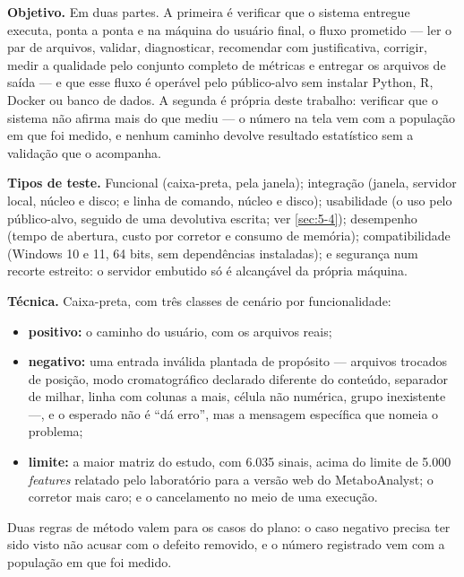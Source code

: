 \textbf{Objetivo.} Em duas partes. A primeira é verificar que o sistema entregue executa, ponta a ponta e na máquina do usuário final, o fluxo prometido --- ler o par de arquivos, validar, diagnosticar, recomendar com justificativa, corrigir, medir a qualidade pelo conjunto completo de métricas e entregar os arquivos de saída --- e que esse fluxo é operável pelo público-alvo sem instalar Python, R, Docker ou banco de dados. A segunda é própria deste trabalho: verificar que o sistema não afirma mais do que mediu --- o número na tela vem com a população em que foi medido, e nenhum caminho devolve resultado estatístico sem a validação que o acompanha.

\textbf{Tipos de teste.} Funcional (caixa-preta, pela janela); integração (janela, servidor local, núcleo e disco; e linha de comando, núcleo e disco); usabilidade (o uso pelo público-alvo, seguido de uma devolutiva escrita; ver \ref{sec:5-4}); desempenho (tempo de abertura, custo por corretor e consumo de memória); compatibilidade (Windows 10 e 11, 64 bits, sem dependências instaladas); e segurança num recorte estreito: o servidor embutido só é alcançável da própria máquina.

\textbf{Técnica.} Caixa-preta, com três classes de cenário por funcionalidade:

\begin{itemize}
\item \textbf{positivo:} o caminho do usuário, com os arquivos reais;
\item \textbf{negativo:} uma entrada inválida plantada de propósito --- arquivos trocados de posição, modo cromatográfico declarado diferente do conteúdo, separador de milhar, linha com colunas a mais, célula não numérica, grupo inexistente ---, e o esperado não é ``dá erro'', mas a mensagem específica que nomeia o problema;
\item \textbf{limite:} a maior matriz do estudo, com 6.035 sinais, acima do limite de 5.000 \textit{features} relatado pelo laboratório para a versão web do MetaboAnalyst; o corretor mais caro; e o cancelamento no meio de uma execução.
\end{itemize}

Duas regras de método valem para os casos do plano: o caso negativo precisa ter sido visto não acusar com o defeito removido, e o número registrado vem com a população em que foi medido.


